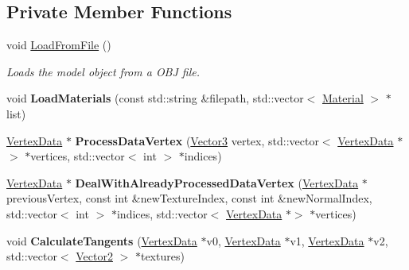 \subsection*{Private Member Functions}
\begin{DoxyCompactItemize}
\item 
void \hyperlink{class_flounder_1_1_model_a4662f9d99d9058e7e1e890c35b9694dd}{Load\+From\+File} ()
\begin{DoxyCompactList}\small\item\em Loads the model object from a O\+BJ file. \end{DoxyCompactList}\item 
\mbox{\label{class_flounder_1_1_model_abc523977daf1f377fe525ed40be030ef}} 
void {\bfseries Load\+Materials} (const std\+::string \&filepath, std\+::vector$<$ \hyperlink{struct_flounder_1_1_material}{Material} $>$ $\ast$list)
\item 
\mbox{\label{class_flounder_1_1_model_a18a98630959dc6241d21838946a0a7f5}} 
\hyperlink{class_flounder_1_1_vertex_data}{Vertex\+Data} $\ast$ {\bfseries Process\+Data\+Vertex} (\hyperlink{class_flounder_1_1_vector3}{Vector3} vertex, std\+::vector$<$ \hyperlink{class_flounder_1_1_vertex_data}{Vertex\+Data} $\ast$$>$ $\ast$vertices, std\+::vector$<$ int $>$ $\ast$indices)
\item 
\mbox{\label{class_flounder_1_1_model_a46cb58f0f1a9fad4447a3d8c188ca9fd}} 
\hyperlink{class_flounder_1_1_vertex_data}{Vertex\+Data} $\ast$ {\bfseries Deal\+With\+Already\+Processed\+Data\+Vertex} (\hyperlink{class_flounder_1_1_vertex_data}{Vertex\+Data} $\ast$previous\+Vertex, const int \&new\+Texture\+Index, const int \&new\+Normal\+Index, std\+::vector$<$ int $>$ $\ast$indices, std\+::vector$<$ \hyperlink{class_flounder_1_1_vertex_data}{Vertex\+Data} $\ast$$>$ $\ast$vertices)
\item 
\mbox{\label{class_flounder_1_1_model_a568fc05268614130289a37bdf6ec2f13}} 
void {\bfseries Calculate\+Tangents} (\hyperlink{class_flounder_1_1_vertex_data}{Vertex\+Data} $\ast$v0, \hyperlink{class_flounder_1_1_vertex_data}{Vertex\+Data} $\ast$v1, \hyperlink{class_flounder_1_1_vertex_data}{Vertex\+Data} $\ast$v2, std\+::vector$<$ \hyperlink{class_flounder_1_1_vector2}{Vector2} $>$ $\ast$textures)
\item 

\end{DoxyCompactItemize}
